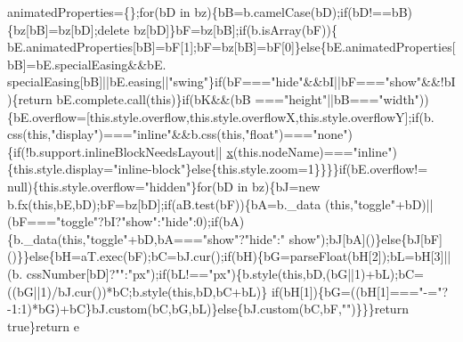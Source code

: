 \begin{DoxyCode}
      animatedProperties=\{\};\textcolor{keywordflow}{for}(bD in bz)\{bB=b.camelCase(bD);\textcolor{keywordflow}{if}(bD!==bB)\{bz[bB]=bz[bD];\textcolor{keyword}{delete} bz[bD]\}bF=bz[bB];\textcolor{keywordflow}{if}(b.isArray(bF))\{
      bE.animatedProperties[bB]=bF[1];bF=bz[bB]=bF[0]\}\textcolor{keywordflow}{else}\{bE.animatedProperties[bB]=bE.specialEasing&&bE.
      specialEasing[bB]||bE.easing||\textcolor{stringliteral}{"swing"}\}\textcolor{keywordflow}{if}(bF===\textcolor{stringliteral}{"hide"}&&bI||bF===\textcolor{stringliteral}{"show"}&&!bI)\{\textcolor{keywordflow}{return} bE.complete.call(\textcolor{keyword}{this})\}\textcolor{keywordflow}{if}(bK&&(bB
      ===\textcolor{stringliteral}{"height"}||bB===\textcolor{stringliteral}{"width"}))\{bE.overflow=[this.style.overflow,this.style.overflowX,this.style.overflowY];\textcolor{keywordflow}{if}(b.
      css(\textcolor{keyword}{this},\textcolor{stringliteral}{"display"})===\textcolor{stringliteral}{"inline"}&&b.css(\textcolor{keyword}{this},\textcolor{stringliteral}{"float"})===\textcolor{stringliteral}{"none"})\{\textcolor{keywordflow}{if}(!b.support.inlineBlockNeedsLayout||
      \hyperlink{jquery_8js_a4c3eadaa5164016d2c340d495fc6e55e}{x}(this.nodeName)===\textcolor{stringliteral}{"inline"})\{this.style.display=\textcolor{stringliteral}{"inline-block"}\}\textcolor{keywordflow}{else}\{this.style.zoom=1\}\}\}\}\textcolor{keywordflow}{if}(bE.overflow!=
      null)\{this.style.overflow=\textcolor{stringliteral}{"hidden"}\}\textcolor{keywordflow}{for}(bD in bz)\{bJ=\textcolor{keyword}{new} b.fx(\textcolor{keyword}{this},bE,bD);bF=bz[bD];\textcolor{keywordflow}{if}(aB.test(bF))\{bA=b.\_data
      (\textcolor{keyword}{this},\textcolor{stringliteral}{"toggle"}+bD)||(bF===\textcolor{stringliteral}{"toggle"}?bI?\textcolor{stringliteral}{"show"}:\textcolor{stringliteral}{"hide"}:0);\textcolor{keywordflow}{if}(bA)\{b.\_data(\textcolor{keyword}{this},\textcolor{stringliteral}{"toggle"}+bD,bA===\textcolor{stringliteral}{"show"}?\textcolor{stringliteral}{"hide"}:\textcolor{stringliteral}{"
      show"});bJ[bA]()\}\textcolor{keywordflow}{else}\{bJ[bF]()\}\}\textcolor{keywordflow}{else}\{bH=aT.exec(bF);bC=bJ.cur();\textcolor{keywordflow}{if}(bH)\{bG=parseFloat(bH[2]);bL=bH[3]||(b.
      cssNumber[bD]?\textcolor{stringliteral}{""}:\textcolor{stringliteral}{"px"});\textcolor{keywordflow}{if}(bL!==\textcolor{stringliteral}{"px"})\{b.style(\textcolor{keyword}{this},bD,(bG||1)+bL);bC=((bG||1)/bJ.cur())*bC;b.style(\textcolor{keyword}{this},bD,bC+bL)\}\textcolor{keywordflow}{
      if}(bH[1])\{bG=((bH[1]===\textcolor{stringliteral}{"-="}?-1:1)*bG)+bC\}bJ.custom(bC,bG,bL)\}\textcolor{keywordflow}{else}\{bJ.custom(bC,bF,\textcolor{stringliteral}{""})\}\}\}\textcolor{keywordflow}{return} \textcolor{keyword}{true}\}\textcolor{keywordflow}{return} e

\end{DoxyCode}
